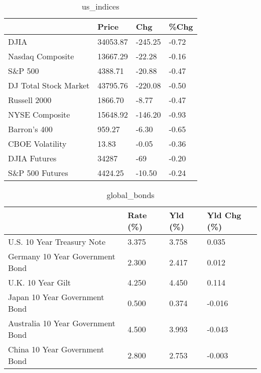 \documentclass{article}%
\begin{document}
%


\begin{table}[htbp]%
\caption{us\_indices}%
\centering%
\begin{adjustbox}{width=1\textwidth}%
\begin{tabular}{llll}
\toprule
                      &    Price &     Chg &  \%Chg \\
\midrule
                 DJIA & 34053.87 & -245.25 & -0.72 \\
     Nasdaq Composite & 13667.29 &  -22.28 & -0.16 \\
              S\&P 500 &  4388.71 &  -20.88 & -0.47 \\
DJ Total Stock Market & 43795.76 & -220.08 & -0.50 \\
         Russell 2000 &  1866.70 &   -8.77 & -0.47 \\
       NYSE Composite & 15648.92 & -146.20 & -0.93 \\
         Barron's 400 &   959.27 &   -6.30 & -0.65 \\
      CBOE Volatility &    13.83 &   -0.05 & -0.36 \\
         DJIA Futures &    34287 &     -69 & -0.20 \\
      S\&P 500 Futures &  4424.25 &  -10.50 & -0.24 \\
\bottomrule
\end{tabular}
%
\end{adjustbox}%
\end{table}

%


\begin{table}[htbp]%
\caption{global\_bonds}%
\centering%
\begin{adjustbox}{width=1\textwidth}%
\begin{tabular}{llll}
\toprule
                                  & Rate (\%) & Yld (\%) & Yld Chg (\%) \\
\midrule
       U.S. 10 Year Treasury Note &    3.375 &   3.758 &       0.035 \\
  Germany 10 Year Government Bond &    2.300 &   2.417 &       0.012 \\
                U.K. 10 Year Gilt &    4.250 &   4.450 &       0.114 \\
    Japan 10 Year Government Bond &    0.500 &   0.374 &      -0.016 \\
Australia 10 Year Government Bond &    4.500 &   3.993 &      -0.043 \\
    China 10 Year Government Bond &    2.800 &   2.753 &      -0.003 \\
\bottomrule
\end{tabular}
%
\end{adjustbox}%
\end{table}
\end{document}
